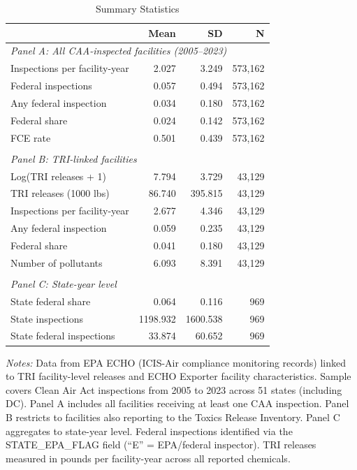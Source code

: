 \begin{table}[htbp]
\centering
\caption{Summary Statistics}
\label{tab:summary}
\begin{threeparttable}
\begin{tabular}{lrrr}
\toprule
 & Mean & SD & N \\
\midrule
\multicolumn{4}{l}{\textit{Panel A: All CAA-inspected facilities (2005--2023)}} \\[3pt]
Inspections per facility-year & 2.027 & 3.249 & 573,162 \\
Federal inspections & 0.057 & 0.494 & 573,162 \\
Any federal inspection & 0.034 & 0.180 & 573,162 \\
Federal share & 0.024 & 0.142 & 573,162 \\
FCE rate & 0.501 & 0.439 & 573,162 \\
\\[6pt]
\multicolumn{4}{l}{\textit{Panel B: TRI-linked facilities}} \\[3pt]
Log(TRI releases + 1) & 7.794 & 3.729 & 43,129 \\
TRI releases (1000 lbs) & 86.740 & 395.815 & 43,129 \\
Inspections per facility-year & 2.677 & 4.346 & 43,129 \\
Any federal inspection & 0.059 & 0.235 & 43,129 \\
Federal share & 0.041 & 0.180 & 43,129 \\
Number of pollutants & 6.093 & 8.391 & 43,129 \\
\\[6pt]
\multicolumn{4}{l}{\textit{Panel C: State-year level}} \\[3pt]
State federal share & 0.064 & 0.116 & 969 \\
State inspections & 1198.932 & 1600.538 & 969 \\
State federal inspections & 33.874 & 60.652 & 969 \\
\bottomrule
\end{tabular}
\begin{tablenotes}[flushleft]
\small
\item \textit{Notes:} Data from EPA ECHO (ICIS-Air compliance monitoring records) linked to TRI facility-level releases and ECHO Exporter facility characteristics. Sample covers Clean Air Act inspections from 2005 to 2023 across 51 states (including DC). Panel A includes all facilities receiving at least one CAA inspection. Panel B restricts to facilities also reporting to the Toxics Release Inventory. Panel C aggregates to state-year level. Federal inspections identified via the STATE\_EPA\_FLAG field (``E'' = EPA/federal inspector). TRI releases measured in pounds per facility-year across all reported chemicals.
\end{tablenotes}
\end{threeparttable}
\end{table}
